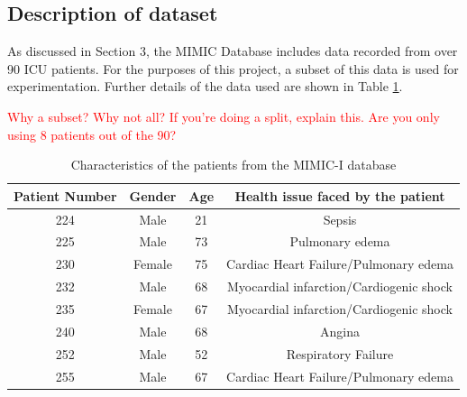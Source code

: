 \subsection{Description of dataset}
As discussed in Section 3, the MIMIC Database includes data
recorded from over 90 ICU patients. For the purposes of this project, a subset of this data is used 
for experimentation. Further details of the data used are shown in Table \ref{tabPatients}.

\textcolor{red}{Why a subset? Why not all? If you're doing a split, explain this. Are you only using 8 patients out of the 90?}

\begin{table}[H]
    \centering
    \begin{tabular}{|cccc|}
    \hline
    \textbf{Patient Number} & \textbf{Gender} & \textbf{Age} & \textbf{Health issue faced by the patient} \\ \hline
    224 & Male   & 21 & Sepsis                                  \\
    225 & Male   & 73 & Pulmonary edema                         \\
    230 & Female & 75 & Cardiac Heart Failure/Pulmonary edema   \\
    232 & Male   & 68 & Myocardial infarction/Cardiogenic shock \\
    235 & Female & 67 & Myocardial infarction/Cardiogenic shock \\
    240 & Male   & 68 & Angina                                  \\
    252 & Male   & 52 & Respiratory Failure                     \\
    255 & Male   & 67 & Cardiac Heart Failure/Pulmonary edema   \\ \hline
    \end{tabular}
    \caption{Characteristics of the patients from the MIMIC-I database}
    \label{tabPatients}
    \end{table}


